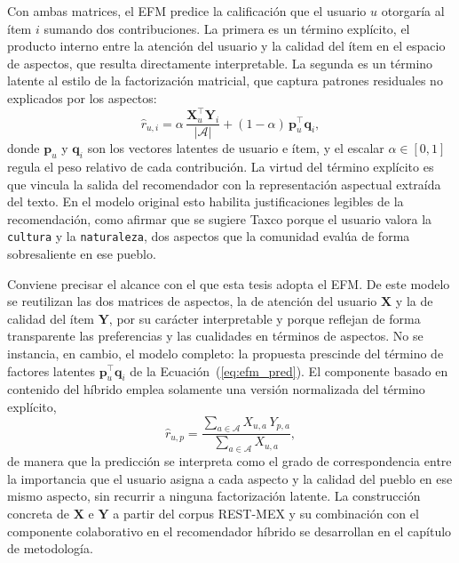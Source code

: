 Con ambas matrices, el EFM predice la calificación que el usuario $u$ otorgaría al ítem $i$ sumando dos contribuciones. La primera es un término explícito, el producto interno entre la atención del usuario y la calidad del ítem en el espacio de aspectos, que resulta directamente interpretable. La segunda es un término latente al estilo de la factorización matricial, que captura patrones residuales no explicados por los aspectos:
\begin{equation} \label{eq:efm_pred}
	\hat{r}_{u,i} = \alpha \, \frac{\mathbf{X}_u^\top \mathbf{Y}_i}{|\mathcal{A}|} + (1 - \alpha) \, \mathbf{p}_u^\top \mathbf{q}_i,
\end{equation}
donde $\mathbf{p}_u$ y $\mathbf{q}_i$ son los vectores latentes de usuario e ítem, y el escalar $\alpha \in [0, 1]$ regula el peso relativo de cada contribución. La virtud del término explícito es que vincula la salida del recomendador con la representación aspectual extraída del texto. En el modelo original esto habilita justificaciones legibles de la recomendación, como afirmar que se sugiere Taxco porque el usuario valora la \texttt{cultura} y la \texttt{naturaleza}, dos aspectos que la comunidad evalúa de forma sobresaliente en ese pueblo.

Conviene precisar el alcance con el que esta tesis adopta el EFM. De este modelo se reutilizan las dos matrices de aspectos, la de atención del usuario $\mathbf{X}$ y la de calidad del ítem $\mathbf{Y}$, por su carácter interpretable y porque reflejan de forma transparente las preferencias y las cualidades en términos de aspectos. No se instancia, en cambio, el modelo completo: la propuesta prescinde del término de factores latentes $\mathbf{p}_u^\top \mathbf{q}_i$ de la Ecuación~(\ref{eq:efm_pred}). El componente basado en contenido del híbrido emplea solamente una versión normalizada del término explícito,
\begin{equation} \label{eq:cbquality}
	\hat{r}_{u,p} = \frac{\sum_{a \in \mathcal{A}} X_{u,a}\, Y_{p,a}}{\sum_{a \in \mathcal{A}} X_{u,a}},
\end{equation}
de manera que la predicción se interpreta como el grado de correspondencia entre la importancia que el usuario asigna a cada aspecto y la calidad del pueblo en ese mismo aspecto, sin recurrir a ninguna factorización latente. La construcción concreta de $\mathbf{X}$ e $\mathbf{Y}$ a partir del corpus REST-MEX y su combinación con el componente colaborativo en el recomendador híbrido se desarrollan en el capítulo de metodología.
